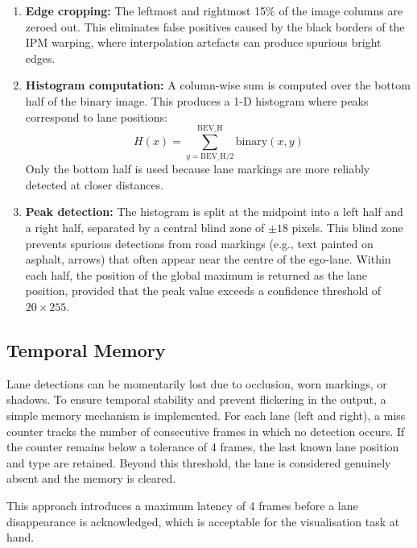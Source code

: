 \documentclass[11pt,a4paper]{article}
\begin{document}
\begin{enumerate}
    \item \textbf{Edge cropping:} The leftmost and rightmost 15\% of the image columns are zeroed out. This eliminates false positives caused by the black borders of the IPM warping, where interpolation artefacts can produce spurious bright edges.
    
    \item \textbf{Histogram computation:} A column-wise sum is computed over the bottom half of the binary image. This produces a 1-D histogram where peaks correspond to lane positions:
    \begin{equation}
        H(x) = \sum_{y = \text{BEV\_H}/2}^{\text{BEV\_H}} \text{binary}(x, y)
    \end{equation}
    Only the bottom half is used because lane markings are more reliably detected at closer distances.
    
    \item \textbf{Peak detection:} The histogram is split at the midpoint into a left half and a right half, separated by a central blind zone of $\pm 18$ pixels. This blind zone prevents spurious detections from road markings (e.g., text painted on asphalt, arrows) that often appear near the centre of the ego-lane. Within each half, the position of the global maximum is returned as the lane position, provided that the peak value exceeds a confidence threshold of $20 \times 255$.
\end{enumerate}


\subsection{Temporal Memory}
\label{sec:memory}

Lane detections can be momentarily lost due to occlusion, worn markings, or shadows. To ensure temporal stability and prevent flickering in the output, a simple memory mechanism is implemented. For each lane (left and right), a miss counter tracks the number of consecutive frames in which no detection occurs. If the counter remains below a tolerance of 4 frames, the last known lane position and type are retained. Beyond this threshold, the lane is considered genuinely absent and the memory is cleared.

This approach introduces a maximum latency of 4 frames before a lane disappearance is acknowledged, which is acceptable for the visualisation task at hand.


\end{document}
